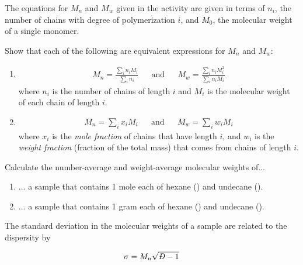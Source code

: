 \begin{activity}
\begin{ctqs}
\end{ctqs}



\begin{exercises}

		\exercise The equations for $M_n$ and $M_w$ given in the activity are given in terms of $n_i$, the number of chains with degree of polymerization $i$, and $M_0$, the molecular weight of a single monomer.
		
		Show that each of the following are equivalent expressions for $M_n$ and $M_w$:
		
			\begin{enumerate}
				
				\item \begin{align*}
					M_n = \frac{\sum_i n_i M_i}{\sum_i n_i} && \text{and} &&  M_w = \frac{\sum_i n_i M_i^2}{\sum_i n_i M_i}
				\end{align*}
					where $n_i$ is the number of chains of length $i$ and $M_i$ is the molecular weight of each chain of length $i$.
				
				\item  \begin{align*}
					M_n = \sum_i x_i M_i && \text{and} && M_w = \sum_i w_i M_i
				\end{align*}
					where $x_i$ is the \emph{mole fraction} of chains that have length $i$, and $w_i$ is the \emph{weight fraction} (fraction of the total mass) that comes from chains of length $i$.
				
			\end{enumerate}
			
		\exercise Calculate the number-average and weight-average molecular weights of...
		
			\begin{enumerate}
			
				\item ... a sample that contains 1 mole each of hexane () and undecane ().
				
				\item ... a sample that contains 1 gram each of hexane () and undecane ().
				
			\end{enumerate}
			
		\exercise The standard deviation in the molecular weights of a sample are related to the dispersity by
		
			\begin{align*}
					\sigma = M_n\sqrt{\PDImath - 1}
			\end{align*}
			

\end{exercises}
\end{activity}
